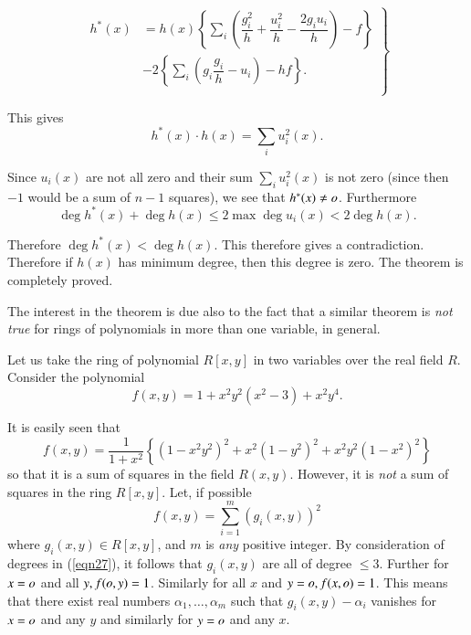 \begin{Proof}
\begin{equation*}
\left.\begin{aligned}
h^{\ast}(x)&=h(x)\left\{\sum\limits_{i}\left(\dfrac{g^{2}_i}{h}+\dfrac{u^{2}_i}{h}-\dfrac{2g_iu_i}{h}\right)-f\right\}\\
                 &-2\left\{\sum\limits_{i}\left(g_i\dfrac{g_i}{h}-u_i\right)-hf\right\}.\\
\end{aligned}\right\}
\end{equation*}

This gives
$$
h^{\ast}(x)\cdot h(x)=\sum\limits_{i}u^{2}_i(x).
$$

Since $u_i(x)$ are not all zero and their sum
$\sum\limits_{i}u^{2}_i(x)$ is not zero (since then $-1$ would be a sum
of $n-1$ squares), we see that $h^{\ast}(x)\neq o$. Furthermore
$$
\deg h^{\ast}(x)+\deg h(x)\leq 2\max \deg u_i(x)<2 \deg h(x).
$$

Therefore $\deg h^{\ast}(x)<\deg h(x)$. This therefore gives a
contradiction. Therefore if $h(x)$ has minimum degree, then this
degree is zero. The theorem is completely proved.
\enprf
\end{Proof}

The interest in the theorem is due also to the fact that a similar
theorem is \textit{not true} for rings of polynomials in more than one
variable, in general.

Let us take the ring of polynomial $R[x,y]$ in two variables over the
real field $R$. Consider the polynomial
\begin{equation}\label{eqn27}
f(x,y)=1+x^{2}y^{2}\left(x^{2}-3\right)+x^{2}y^{4}.
\end{equation}

It is easily seen that 
$$
f(x,y)=\dfrac{1}{1+x^{2}}\left\{\left(1-x^{2}y^{2}\right)^{2}+x^{2}\left(1-y^{2}\right)^{2}+x^{2}y^{2}\left(1-x^{2}\right)^{2}\right\}
$$
so that it is a sum of squares in the field $R(x,y)$. However, it is
\textit{not} a sum of squares in the ring $R[x,y]$. Let, if possible 
\begin{equation}\label{eqn28}
f(x,y)=\sum\limits^{m}_{i=1}(g_i(x,y))^{2}
\end{equation}
where $g_i(x,y)\in R[x,y]$, and $m$ is \textit{any} positive
integer. By consideration of degrees in (\ref{eqn27}), it follows that
$g_i(x,y)$ are all of degree $\leq 3$. Further for $x=o$ and all
$y,f(o,y)=1$. Similarly for all $x$ and $y=o, f(x,o)=1$. This
means that there exist real numbers $\alpha_1,\ldots,\alpha_m$ such
that $g_i(x,y)-\alpha_i$ vanishes for $x=o$ and any $y$ and
similarly for $y=o$ and any $x$.


